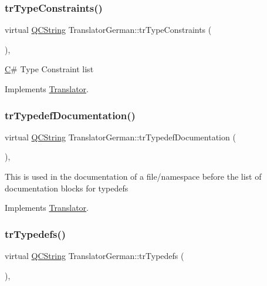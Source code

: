 \subsubsection{\texorpdfstring{trTypeConstraints()}{trTypeConstraints()}}
{\footnotesize\ttfamily virtual \mbox{\hyperlink{class_q_c_string}{Q\+C\+String}} Translator\+German\+::tr\+Type\+Constraints (\begin{DoxyParamCaption}{ }\end{DoxyParamCaption})\hspace{0.3cm}{\ttfamily [inline]}, {\ttfamily [virtual]}}

\mbox{\hyperlink{class_c}{C}}\# Type Constraint list 

Implements \mbox{\hyperlink{class_translator}{Translator}}.

\mbox{\label{class_translator_german_adf47de425db2809bb7056906b168651f}} 
\subsubsection{\texorpdfstring{trTypedefDocumentation()}{trTypedefDocumentation()}}
{\footnotesize\ttfamily virtual \mbox{\hyperlink{class_q_c_string}{Q\+C\+String}} Translator\+German\+::tr\+Typedef\+Documentation (\begin{DoxyParamCaption}{ }\end{DoxyParamCaption})\hspace{0.3cm}{\ttfamily [inline]}, {\ttfamily [virtual]}}

This is used in the documentation of a file/namespace before the list of documentation blocks for typedefs 

Implements \mbox{\hyperlink{class_translator}{Translator}}.

\mbox{\label{class_translator_german_ac57949ca2eef76c6840ff0b815015687}} 
\subsubsection{\texorpdfstring{trTypedefs()}{trTypedefs()}}
{\footnotesize\ttfamily virtual \mbox{\hyperlink{class_q_c_string}{Q\+C\+String}} Translator\+German\+::tr\+Typedefs (\begin{DoxyParamCaption}{ }\end{DoxyParamCaption})\hspace{0.3cm}{\ttfamily [inline]}, {\ttfamily [virtual]}}

